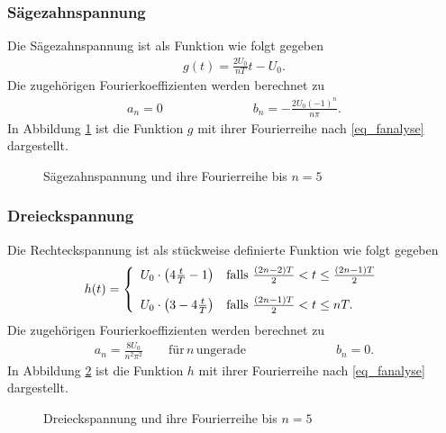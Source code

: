 \subsubsection{Sägezahnspannung}
Die Sägezahnspannung ist als Funktion wie folgt gegeben
\begin{align*}			
 g(t) = \frac{2U_0}{nT}t - U_0.
\end{align*}
Die zugehörigen Fourierkoeffizienten werden berechnet zu
\begin{align}
 a_n = 0 \hspace{3cm} b_n = - \frac{2U_0 (-1)^n}{n \pi}.
\end{align}
In Abbildung \ref{pic_saegezahnfourier} ist die Funktion $g$ mit ihrer Fourierreihe nach \eqref{eq_fanalyse} dargestellt.
\begin{figure}[H]
 
 \caption{Sägezahnspannung und ihre Fourierreihe bis $n=5$}
 \label{pic_saegezahnfourier}
\end{figure}

\subsubsection{Dreieckspannung}
Die Rechteckspannung ist als stückweise definierte Funktion wie folgt gegeben
\begin{align*}			
h(t) =
	\left\{
	\begin{array}{ll}
	U_0 \cdot \left( 4\frac{t}{T} - 1 \right)
	& \text{falls } \frac{(2n-2)T}{2} < t \leq \frac{(2n-1)T}{2}
	\vspace{10pt}
	\\
	U_0 \cdot \left( 3 - 4 \frac{t}{T} \right)
	& \text{falls } \frac{(2n-1)T}{2} < t \leq nT.
	\end{array}
\right.
\end{align*}
Die zugehörigen Fourierkoeffizienten werden berechnet zu
\begin{align}
  a_n = \frac{8U_0}{n^2 \pi^2} \qquad \text{für}\, n\, \text{ungerade}  \hspace{3cm} b_n = 0.
\end{align}
In Abbildung \ref{pic_dreieckfourier} ist die Funktion $h$ mit ihrer Fourierreihe nach \eqref{eq_fanalyse} dargestellt.			

\begin{figure}[H]
 
 \caption{Dreieckspannung und ihre Fourierreihe bis $n=5$}
 \label{pic_dreieckfourier}
\end{figure}


